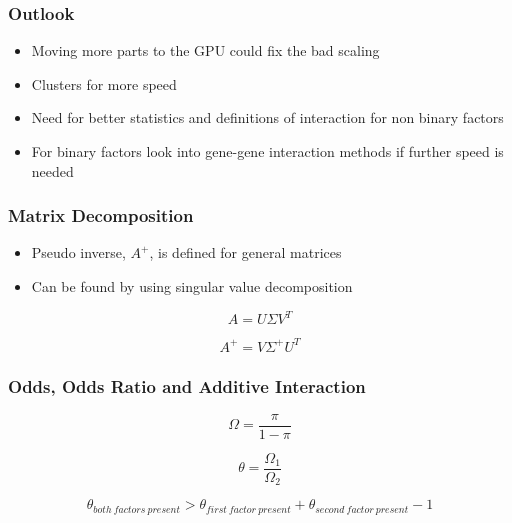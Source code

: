 \documentclass{beamer}
\begin{document}
\begin{frame}
\frametitle{Outlook}

\begin{itemize}
 \item Moving more parts to the GPU could fix the bad scaling
 \item Clusters for more speed
 \item Need for better statistics and definitions of interaction for non binary factors
 \item For binary factors look into gene-gene interaction methods if further speed is needed
\end{itemize}

\end{frame}


\begin{frame}
\frametitle{Matrix Decomposition}

\begin{itemize}
 \item Pseudo inverse, $A^+$, is defined for general matrices
 \item Can be found by using singular value decomposition
\end{itemize}

\begin{equation*}
A=U \Sigma V^T
\end{equation*}

\begin{equation*}
A^+=V \Sigma^+ U^T
\end{equation*}

\end{frame}

\begin{frame}
\frametitle{Odds, Odds Ratio and Additive Interaction}

\begin{equation*}\label{eq:odds}
\Omega=\frac{\pi}{1-\pi}
\end{equation*}

\begin{equation*}\label{eq:odds_ratio}
\theta=\frac{\Omega_1}{\Omega_2}
\end{equation*}

\begin{equation*}
\theta_{both\:factors\:present}>\theta_{first\:factor\:present}+\theta_{second\:factor\:present}-1
\end{equation*}

\end{frame}


\end{document}
